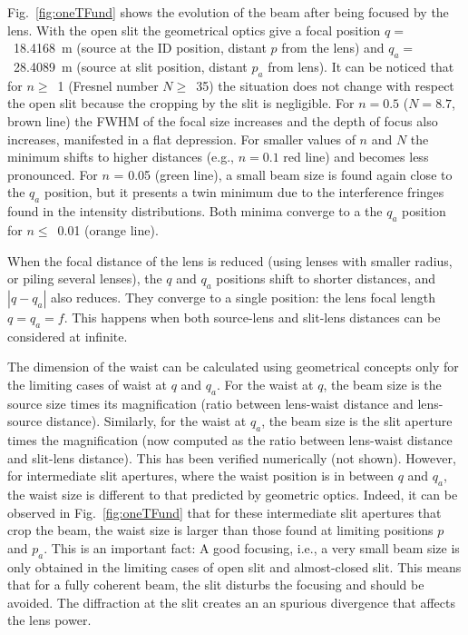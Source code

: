 \documentclass{iucr}              %
\begin{document}
Fig.~\ref{fig:oneTFund} shows the evolution of the beam after being focused by the lens. With the open slit the geometrical optics give a focal position $q=$~\SI{18.4168}{\meter} (source at the ID position, distant $p$ from the lens) and $q_a=$~\SI{28.4089}{\meter} (source at slit position, distant $p_a$ from lens). It can be noticed that for $n\ge$~1 (Fresnel number $N\ge$~35) the situation does not change with respect the open slit because the cropping by the slit is negligible. For $n=0.5$ ($N=8.7$, brown line) the FWHM of the focal size increases and the depth of focus also increases, manifested in a flat depression. For smaller values of $n$ and $N$ the minimum shifts to higher distances (e.g., $n=0.1$ red line) and becomes less pronounced. For $n$ = 0.05 (green line), a small beam size is found again close to the $q_a$ position, but it presents a twin minimum due to the interference fringes found in the intensity distributions. Both minima converge to a the $q_a$ position for $n\le$~0.01 (orange line). 

When the focal distance of the lens is reduced (using lenses with smaller radius, or piling several lenses), the $q$ and $q_a$ positions shift to shorter distances, and  $|q-q_a|$ also reduces. They converge to a single position: the lens focal length $q=q_a=f$. This happens when both source-lens and slit-lens distances can be considered at infinite. 

The dimension of the waist can be calculated using geometrical concepts only for the limiting cases of waist at $q$ and $q_a$. For the waist at $q$, the beam size is the source size times its magnification (ratio between lens-waist distance and lens-source distance). Similarly, for the waist at $q_a$, the beam size is the slit aperture times the magnification (now computed as the ratio between lens-waist distance and slit-lens distance). This has been verified numerically (not shown). However, for intermediate slit apertures, where the waist position is in between $q$ and $q_a$, the waist size is different to that predicted by geometric optics.
Indeed, it can be observed in Fig.~\ref{fig:oneTFund} that for these intermediate slit apertures that crop the beam, the waist size is larger than those found at limiting positions $p$ and $p_a$.
This is an important fact: A good focusing, i.e., a very small beam size is only obtained in the limiting cases of open slit and almost-closed slit. This means that for a fully coherent beam, the slit disturbs the focusing and should be avoided. The diffraction at the slit creates an an spurious divergence that affects the lens power. 
\end{document}
